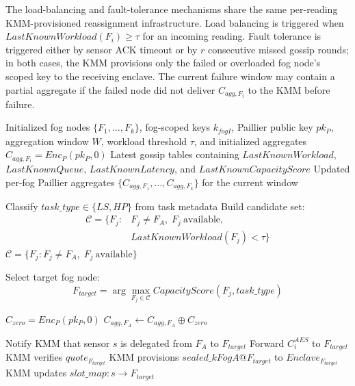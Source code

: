 \documentclass[conference]{IEEEtran}
\begin{document}
    The load-balancing and fault-tolerance mechanisms share the same per-reading KMM-provisioned reassignment infrastructure. Load balancing is triggered when $LastKnownWorkload(F_i) \geq \tau$ for an incoming reading. Fault tolerance is triggered either by sensor ACK timeout or by $r$ consecutive missed gossip rounds; in both cases, the KMM provisions only the failed or overloaded fog node's scoped key to the receiving enclave. The current failure window may contain a partial aggregate if the failed node did not deliver $C_{agg,F_i}$ to the KMM before failure.
\begin{algorithm}
\caption{Runtime TEE-Assisted Paillier Slot Aggregation with Load-Balanced Delegation}
\label{alg:runtime_delegation}
\begin{algorithmic}[1]
\REQUIRE Initialized fog nodes $\{F_1,\ldots,F_k\}$, fog-scoped keys $k_{fogI}$, Paillier public key $pk_P$, aggregation window $W$, workload threshold $\tau$, and initialized aggregates $C_{agg,F_i}=Enc_P(pk_P,0)$
\REQUIRE Latest gossip tables containing $LastKnownWorkload$, $LastKnownQueue$, $LastKnownLatency$, and $LastKnownCapacityScore$
\ENSURE Updated per-fog Paillier aggregates $\{C_{agg,F_1},\ldots,C_{agg,F_k}\}$ for the current window

        \STATE Classify $task\_type \in \{LS,HP\}$ from task metadata
        \STATE Build candidate set:
        \[
        \begin{aligned}
        \mathcal{C}=\{F_j: & F_j\neq F_A,\;F_j\ \text{available},\\
        & LastKnownWorkload(F_j)<\tau\}
        \end{aligned}
        \]
            \STATE $\mathcal{C}=\{F_j:F_j\neq F_A,\;F_j\ \text{available}\}$
        \ENDIF

        \STATE Select target fog node:
        \[
        F_{target}=\arg\max_{F_j\in\mathcal{C}} CapacityScore(F_j,task\_type)
        \]

            \STATE $C_{zero}=Enc_P(pk_P,0)$
            \STATE $C_{agg,F_A}\leftarrow C_{agg,F_A}\oplus C_{zero}$
        \ENDIF

        \STATE Notify KMM that sensor $s$ is delegated from $F_A$ to $F_{target}$
        \STATE Forward $C_i^{AES}$ to $F_{target}$
        \STATE KMM verifies $quote_{F_{target}}$
        \STATE KMM provisions $sealed\_kFogA@F_{target}$ to $Enclave_{F_{target}}$
        \STATE KMM updates $slot\_map:s\rightarrow F_{target}$


\end{algorithmic}
\end{algorithm}
\end{document}
